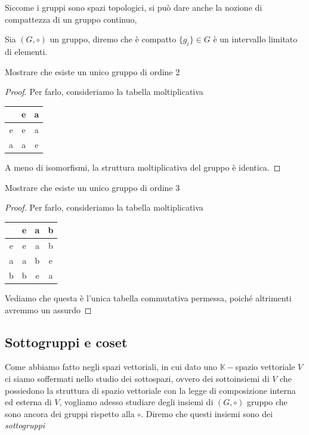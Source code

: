 Siccome i gruppi sono spazi topologici, si può dare anche la nozione di compattezza di un gruppo continuo,
\begin{definition}
	Sia $(G, \circ)$ un gruppo, diremo che è compatto $\{ g_i \} \in G$ è un intervallo limitato di elementi.
\end{definition}

\begin{exercise}
	Mostrare che esiste un unico gruppo di ordine 2
\end{exercise}
\begin{proof}
	Per farlo, consideriamo la tabella moltiplicativa
	\begin{table}[H]
		\centering
		\begin{tabular}{c | c c}
			\, & e & a \\
			\hline
			e & e & a \\
			a & a & e
		\end{tabular}
	\end{table}
	A meno di isomorfismi, la struttura moltiplicativa del gruppo è identica.
\end{proof}

\begin{exercise}
	Mostrare che esiste un unico gruppo di ordine 3
\end{exercise}
\begin{proof}
	Per farlo, consideriamo la tabella moltiplicativa
	\begin{table}[H]
		\centering
		\begin{tabular}{c | c c c}
			\, & e & a & b \\
			\hline
			e  & e & a & b \\
			a  & a & b & e \\
			b  & b & e & a \\
		\end{tabular}
	\end{table}
	Vediamo che questa è l'unica tabella commutativa permessa, poiché altrimenti avremmo un assurdo
\end{proof}

\subsection{Sottogruppi e coset}

Come abbiamo fatto negli spazi vettoriali, in cui dato uno $\mathbb{K}-$spazio vettoriale $V$ ci siamo soffermati nello studio dei sottospazi, ovvero dei sottoinsiemi di $V$ che
possiedono la struttura di spazio vettoriale con la legge di composizione interna ed esterna di $V$, vogliamo adesso studiare degli insiemi di $(G, \circ)$ gruppo che sono ancora dei
gruppi rispetto alla $\circ$. Diremo che questi insiemi sono dei \emph{sottogruppi}

